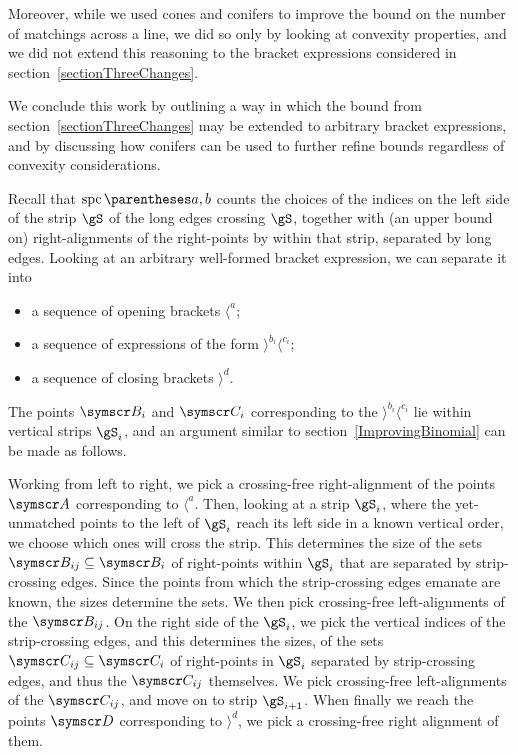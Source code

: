 Moreover, while we used cones and conifers to improve the bound on the number of matchings across a
line, we did so only by looking at convexity properties, and we did not extend this reasoning
to the bracket expressions considered in section~\ref{sectionThreeChanges}.

We conclude this work by outlining a way in which the bound from section~\ref{sectionThreeChanges}
may be extended to arbitrary bracket expressions, and by discussing how conifers can be used to further
refine bounds regardless of convexity considerations.

Recall that $\spc\of{a, b}$ counts the choices of the indices on the left side of the strip $\gS$
of the long edges crossing $\gS$, together with (an upper bound on) right-alignments of the
right-points by within that strip, separated by long edges.
Looking at an arbitrary well-formed bracket expression, we can separate it into\begin{itemize}
\item a sequence of opening brackets $\langle^a$;
\item a sequence of expressions of the form $\rangle^{b_i}\langle^{c_i}$;
\item a sequence of closing brackets $\rangle^d$.
\end{itemize}
The points $\pointset B_i$ and $\pointset C_i$ corresponding to the $\rangle^{b_i}\langle^{c_i}$ lie
within vertical strips $\gS_i$, and an
argument similar to section~\ref{ImprovingBinomial} can be made as follows.

Working from left to right, we pick a crossing-free right-alignment of the points $\pointset A$ corresponding
to $\langle^a$. Then, looking at a strip $\gS_i$, where the yet-unmatched points to the left of $\gS_i$ reach
its left side in a known vertical order, we choose which ones will cross the strip. This determines the size of
the sets $\pointset B_{ij} \Subset \pointset B_i$ of right-points within $\gS_i$ that are separated
by strip-crossing edges. Since the points from which the strip-crossing edges emanate are known,
the sizes determine the sets. We then pick crossing-free left-alignments of the $\pointset B_{ij}$.
On the right side of the $\gS_i$, we pick the vertical indices of the
strip-crossing edges, and this determines the sizes, of the sets $\pointset C_{ij}\Subset \pointset C_i$
of right-points in $\gS_i$ separated by strip-crossing edges, and thus the $\pointset C_{ij}$ themselves.
We pick crossing-free left-alignments of the $\pointset C_{ij}$, and move on to strip $\gS_{i+1}$.
When finally we reach the points $\pointset D$ corresponding to $\rangle^d$, we pick a crossing-free right
alignment of them.

